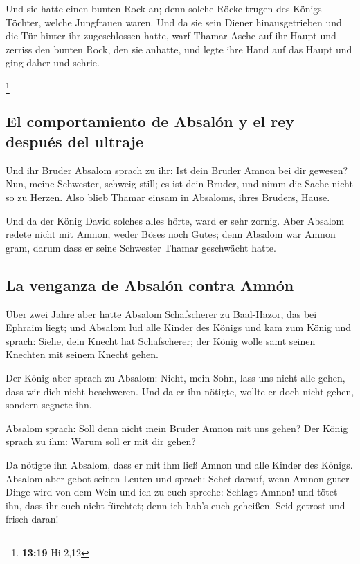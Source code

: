  Und sie hatte einen bunten Rock an; denn solche Röcke
trugen des Königs Töchter, welche Jungfrauen waren. Und da sie sein
Diener hinausgetrieben und die Tür hinter ihr zugeschlossen hatte,
 warf Thamar Asche auf ihr Haupt und zerriss den bunten
Rock, den sie anhatte, und legte ihre Hand auf das Haupt und ging daher
und schrie.

\footnote{\textbf{13:19} Hi 2,12}

\hypertarget{el-comportamiento-de-absaluxf3n-y-el-rey-despuuxe9s-del-ultraje}{%
\subsection{El comportamiento de Absalón y el rey después del
ultraje}\label{el-comportamiento-de-absaluxf3n-y-el-rey-despuuxe9s-del-ultraje}}

 Und ihr Bruder Absalom sprach zu ihr: Ist dein Bruder
Amnon bei dir gewesen? Nun, meine Schwester, schweig still; es ist dein
Bruder, und nimm die Sache nicht so zu Herzen. Also blieb Thamar einsam
in Absaloms, ihres Bruders, Hause.

 Und da der König David solches alles hörte, ward er sehr
zornig. Aber Absalom redete nicht mit Amnon, weder Böses noch Gutes;
 denn Absalom war Amnon gram, darum dass er seine
Schwester Thamar geschwächt hatte.

\hypertarget{la-venganza-de-absaluxf3n-contra-amnuxf3n}{%
\subsection{La venganza de Absalón contra
Amnón}\label{la-venganza-de-absaluxf3n-contra-amnuxf3n}}

 Über zwei Jahre aber hatte Absalom Schafscherer zu
Baal-Hazor, das bei Ephraim liegt; und Absalom lud alle Kinder des
Königs  und kam zum König und sprach: Siehe, dein Knecht
hat Schafscherer; der König wolle samt seinen Knechten mit seinem Knecht
gehen.

 Der König aber sprach zu Absalom: Nicht, mein Sohn, lass
uns nicht alle gehen, dass wir dich nicht beschweren. Und da er ihn
nötigte, wollte er doch nicht gehen, sondern segnete ihn.

 Absalom sprach: Soll denn nicht mein Bruder Amnon mit
uns gehen? Der König sprach zu ihm: Warum soll er mit dir gehen?

 Da nötigte ihn Absalom, dass er mit ihm ließ Amnon und
alle Kinder des Königs.  Absalom aber gebot seinen Leuten
und sprach: Sehet darauf, wenn Amnon guter Dinge wird von dem Wein und
ich zu euch spreche: Schlagt Amnon! und tötet ihn, dass ihr euch nicht
fürchtet; denn ich hab's euch geheißen. Seid getrost und frisch daran!

